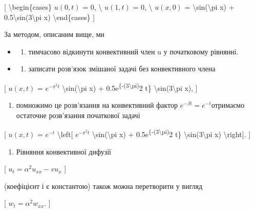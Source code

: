 \documentclass[
]{article}
\providecommand{\tightlist}{%
  \setlength{\itemsep}{0pt}\setlength{\parskip}{0pt}}
\begin{document}
{{{[} \textbackslash begin\{cases\} \(u(0, t)\) = 0, \textbackslash{}
\(u(1, t)\) = 0, \textbackslash{} \(u(x, 0)\) =
\textbackslash sin(\textbackslash pi x) +
0.5\textbackslash sin(3\textbackslash pi x) \textbackslash end\{cases\}
{]}

За методом, описаним вище, ми

\begin{itemize}
\tightlist
\item
  \begin{enumerate}
  \def\labelenumi{\alph{enumi})}
  \tightlist
  \item
    тимчасово відкинути конвективний член u у початковому рівнянні.
  \end{enumerate}
\item
  \begin{enumerate}
  \def\labelenumi{\alph{enumi})}
  \setcounter{enumi}{1}
  \tightlist
  \item
    записати розв'язок змішаної задачі без конвективного члена
  \end{enumerate}
\end{itemize}

{[} \(u(x, t)\) = \(e^{-\pi^2 t}\) \textbackslash sin(\textbackslash pi
x) + 0.5e\textsuperscript{\{-(3\textbackslash pi)}2 t\}
\textbackslash sin(3\textbackslash pi x), {]}

\begin{enumerate}
\def\labelenumi{\alph{enumi})}
\setcounter{enumi}{2}
\tightlist
\item
  помножимо це розв'язання на конвективний фактор
  \(e^{-\beta t}=e^{-t}\)отримаємо остаточне розв'язання початкової
  задачі
\end{enumerate}

{[} \(u(x, t)\) = \(e^{-t}\) \textbackslash left{[} \(e^{-\pi^2 t}\)
\textbackslash sin(\textbackslash pi x) +
0.5e\textsuperscript{\{-(3\textbackslash pi)}2 t\}
\textbackslash sin(3\textbackslash pi x) \textbackslash right{]}. {]}

\begin{enumerate}
\def\labelenumi{\arabic{enumi}.}
\setcounter{enumi}{1}
\tightlist
\item
  Рівняння конвективної дифузії
\end{enumerate}

{[} \(u_t = \alpha^2 u_{xx} - v u_x\) {]}

(коефіцієнт і є константою) також можна перетворити у вигляд

{[} \(w_t = \alpha^2 w_{xx}\). {]}

}}
\end{document}
